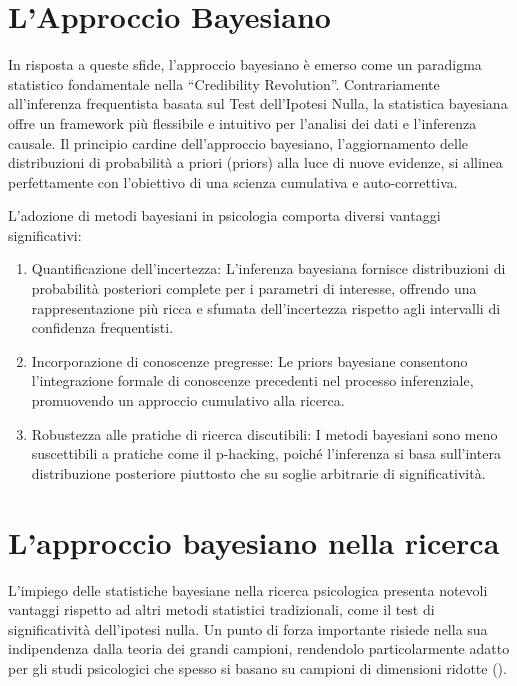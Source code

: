 \documentclass[
  letterpaper,
  DIV=11,
  numbers=noendperiod]{scrreprt}
\providecommand{\tightlist}{%
  \setlength{\itemsep}{0pt}\setlength{\parskip}{0pt}}\usepackage{longtable,booktabs,array}
\theoremstyle{definition}
\theoremstyle{remark}
\begin{document}
\section{L'Approccio Bayesiano}\label{lapproccio-bayesiano}

In risposta a queste sfide, l'approccio bayesiano è emerso come un
paradigma statistico fondamentale nella ``Credibility Revolution''.
Contrariamente all'inferenza frequentista basata sul Test dell'Ipotesi
Nulla, la statistica bayesiana offre un framework più flessibile e
intuitivo per l'analisi dei dati e l'inferenza causale. Il principio
cardine dell'approccio bayesiano, l'aggiornamento delle distribuzioni di
probabilità a priori (priors) alla luce di nuove evidenze, si allinea
perfettamente con l'obiettivo di una scienza cumulativa e
auto-correttiva.

L'adozione di metodi bayesiani in psicologia comporta diversi vantaggi
significativi:

\begin{enumerate}
\def\labelenumi{\arabic{enumi}.}
\tightlist
\item
  Quantificazione dell'incertezza: L'inferenza bayesiana fornisce
  distribuzioni di probabilità posteriori complete per i parametri di
  interesse, offrendo una rappresentazione più ricca e sfumata
  dell'incertezza rispetto agli intervalli di confidenza frequentisti.
\item
  Incorporazione di conoscenze pregresse: Le priors bayesiane consentono
  l'integrazione formale di conoscenze precedenti nel processo
  inferenziale, promuovendo un approccio cumulativo alla ricerca.
\item
  Robustezza alle pratiche di ricerca discutibili: I metodi bayesiani
  sono meno suscettibili a pratiche come il p-hacking, poiché
  l'inferenza si basa sull'intera distribuzione posteriore piuttosto che
  su soglie arbitrarie di significatività.
\end{enumerate}

\section{L'approccio bayesiano nella
ricerca}\label{lapproccio-bayesiano-nella-ricerca}

L'impiego delle statistiche bayesiane nella ricerca psicologica presenta
notevoli vantaggi rispetto ad altri metodi statistici tradizionali, come
il test di significatività dell'ipotesi nulla. Un punto di forza
importante risiede nella sua indipendenza dalla teoria dei grandi
campioni, rendendolo particolarmente adatto per gli studi psicologici
che spesso si basano su campioni di dimensioni ridotte
().
\end{document}
